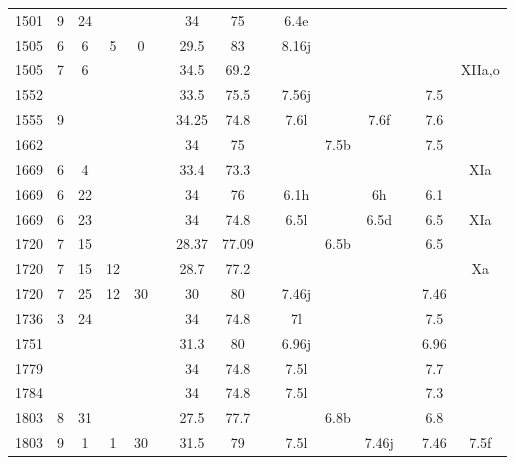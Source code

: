 \begin{flushleft}
\begin{longtable}{|c|c|c|c|c|c|c|c|c|c|c|c|c|c|c|}
1501 & 9  & 24 &    &    &    & 34      & 75      &      & 6.4e  &      &       &      &      &        \\
1505 & 6  & 6  & 5  & 0  &    & 29.5    & 83      &      & 8.16j &      &       &      &      &        \\
1505 & 7  & 6  &    &    &    & 34.5    & 69.2    &      &       &      &       &      &      & XIIa,o \\
1552 &    &    &    &    &    & 33.5    & 75.5    &      & 7.56j &      &       &      & 7.5  &        \\
1555 & 9  &    &    &    &    & 34.25   & 74.8    &      & 7.6l  &      & 7.6f  &      & 7.6  &        \\
1662 &    &    &    &    &    & 34      & 75      &      &       & 7.5b &       &      & 7.5  &        \\
1669 & 6  & 4  &    &    &    & 33.4    & 73.3    &      &       &      &       &      &      & XIa    \\
1669 & 6  & 22 &    &    &    & 34      & 76      &      & 6.1h  &      & 6h    &      & 6.1  &        \\
1669 & 6  & 23 &    &    &    & 34      & 74.8    &      & 6.5l  &      & 6.5d  &      & 6.5  & XIa    \\
1720 & 7  & 15 &    &    &    & 28.37   & 77.09   &      &       & 6.5b &       &      & 6.5  &        \\
1720 & 7  & 15 & 12 &    &    & 28.7    & 77.2    &      &       &      &       &      &      & Xa     \\
1720 & 7  & 25 & 12 & 30 &    & 30      & 80      &      & 7.46j &      &       &      & 7.46 &        \\
1736 & 3  & 24 &    &    &    & 34      & 74.8    &      & 7l    &      &       &      & 7.5  &        \\
1751 &    &    &    &    &    & 31.3    & 80      &      & 6.96j &      &       &      & 6.96 &        \\
1779 &    &    &    &    &    & 34      & 74.8    &      & 7.5l  &      &       &      & 7.7  &        \\
1784 &    &    &    &    &    & 34      & 74.8    &      & 7.5l  &      &       &      & 7.3  &        \\
1803 & 8  & 31 &    &    &    & 27.5    & 77.7    &      &       & 6.8b &       &      & 6.8  &        \\
1803 & 9  & 1  & 1  & 30 &    & 31.5    & 79      &      & 7.5l  &      & 7.46j &      & 7.46 & 7.5f   \\

\end{longtable}
\end{flushleft}

